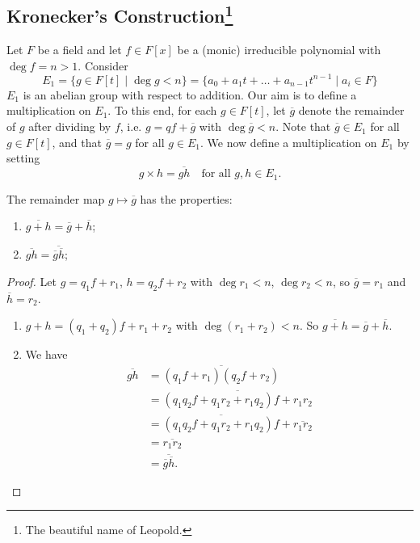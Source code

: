\subsection[Kronecker's Construction]{Kronecker's Construction\footnote{The beautiful name of Leopold.}}
Let $F$ be a field and let $f \in F[x]$ be a (monic) irreducible polynomial with $\deg{f} = n > 1$. Consider
\[
	E_1 = \{g \in F[t] \mid \deg{g} < n\} = \{a_0 + a_1 t + \dots + a_{n - 1}t^{n - 1} \mid a_i \in F\}
\]
$E_1$ is an abelian group with respect to addition. Our aim is to define a multiplication on $E_1$. To this end, for each $g \in F[t]$, let $\overline{g}$ denote the remainder of $g$ after dividing by $f$, i.e. $g = qf + \overline{g}$ with $\deg{\overline{g}} < n$. Note that $\overline{g} \in E_1$ for all $g \in F[t]$, and that $\overline{g} = g$ for all $g \in E_1$. We now define a multiplication on $E_1$ by setting
\[
	g \times h = \overline{gh} \quad \text{for all } g, h \in E_1.
\]

\begin{lemma}
	The remainder map $g \mapsto \overline{g}$ has the properties:
	\begin{enumerate}
		\item $\overline{g + h} = \overline{g} + \overline{h}$;
		\item $\overline{gh} = \overline{\overline{g}\overline{h}}$;
	\end{enumerate}
	\begin{proof}
		Let $g = q_1 f + r_1$, $h = q_2 f + r_2$ with $\deg{r_1} < n$, $\deg{r_2} < n$, so $\overline{g} = r_1$ and $\overline{h} = r_2$.
		\begin{enumerate}
			\item $g + h = (q_1 + q_2)f + r_1 + r_2$ with $\deg{(r_1 + r_2)} < n$. So $\overline{g + h} = \overline{g} + \overline{h}$.
			\item We have
			\begin{align*}
				\overline{gh} &= \overline{(q_1 f + r_1)(q_2 f + r_2)} \\
											&= \overline{(q_1 q_2 f + q_1 r_2 + r_1 q_2)f + r_1 r_2} \\
											&= \overline{(q_1 q_2 f + q_1 r_2 + r_1 q_2)f} + \overline{r_1 r_2} \\
											&= \overline{r_1 r_2} \\
											&= \overline{\overline{g}\overline{h}}.
			\end{align*}
		\end{enumerate}
	\end{proof}
\end{lemma}

